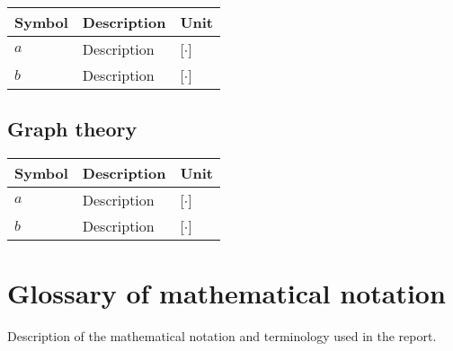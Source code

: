 \begin{tabular}{l l l} 
	\textbf{Symbol}		&	\textbf{Description}										& \textbf{Unit}	\\\hline
	$a$					&	Description									    			& [$\cdot$]\\
	$b$					&	Description 						    					& [$\cdot$]\\	
\end{tabular}

\subsection*{Graph theory}

\begin{tabular}{l l l} 
	\textbf{Symbol}		&	\textbf{Description}										& \textbf{Unit}	\\\hline
	$a$					&	Description									    			& [$\cdot$]\\
	$b$					&	Description		    										& [$\cdot$]\\
\end{tabular}	

\section*{Glossary of mathematical notation}

Description of the mathematical notation and terminology used in the report.




